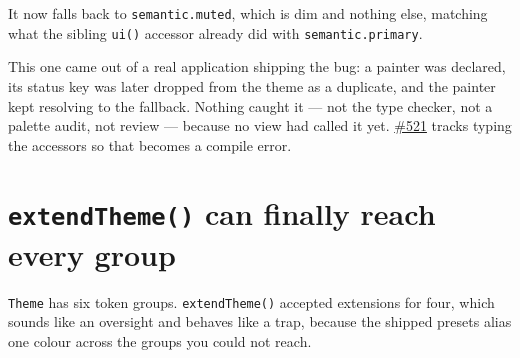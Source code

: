 It now falls back to \texttt{s\allowbreak{}e\allowbreak{}m\allowbreak{}a\allowbreak{}n\allowbreak{}t\allowbreak{}i\allowbreak{}c\allowbreak{}.\allowbreak{}m\allowbreak{}u\allowbreak{}t\allowbreak{}e\allowbreak{}d}, which is dim and nothing else, matching what the sibling \texttt{u\allowbreak{}i\allowbreak{}(\allowbreak{})} accessor already did with \texttt{s\allowbreak{}e\allowbreak{}m\allowbreak{}a\allowbreak{}n\allowbreak{}t\allowbreak{}i\allowbreak{}c\allowbreak{}.\allowbreak{}p\allowbreak{}r\allowbreak{}i\allowbreak{}m\allowbreak{}a\allowbreak{}r\allowbreak{}y}.

This one came out of a real application shipping the bug: a painter was declared, its status key was later dropped from the theme as a duplicate, and the painter kept resolving to the fallback. Nothing caught it --- not the type checker, not a palette audit, not review --- because no view had called it yet. \href{https://github.com/flyingrobots/bijou/issues/521}{\#521} tracks typing the accessors so that becomes a compile error.

\section{\texorpdfstring{\texttt{e\allowbreak{}x\allowbreak{}t\allowbreak{}e\allowbreak{}n\allowbreak{}d\allowbreak{}T\allowbreak{}h\allowbreak{}e\allowbreak{}m\allowbreak{}e\allowbreak{}(\allowbreak{})} can finally reach every group}{ can finally reach every group}}\label{record-284-extendtheme-can-finally-reach-every-group}

\texttt{T\allowbreak{}h\allowbreak{}e\allowbreak{}m\allowbreak{}e} has six token groups. \texttt{e\allowbreak{}x\allowbreak{}t\allowbreak{}e\allowbreak{}n\allowbreak{}d\allowbreak{}T\allowbreak{}h\allowbreak{}e\allowbreak{}m\allowbreak{}e\allowbreak{}(\allowbreak{})} accepted extensions for four, which sounds like an oversight and behaves like a trap, because the shipped presets alias one colour across the groups you could not reach.

